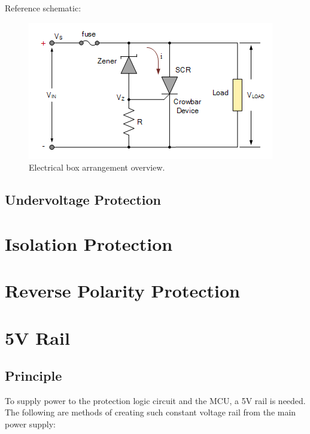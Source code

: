 \documentclass[main.tex]{subfiles}
\begin{document}
    \justify
    Reference schematic:

    \begin{figure}[!h]
        \centerline{\includegraphics[scale=0.5]{media/Zener_Crowbar_OVP.png}}
        \caption{Electrical box arrangement overview.}
        \label{fig:enclosure_arrange}
    \end{figure}

    \subsection{Undervoltage Protection}
    
    \section{Isolation Protection}

    \section{Reverse Polarity Protection}

    \pagebreak

    \section{5V Rail}

    \subsection{Principle}
    \justify
    To supply power to the protection logic circuit and the MCU, a 5V rail is needed. The following are methods of creating such constant voltage rail from the main power supply:
\end{document}
